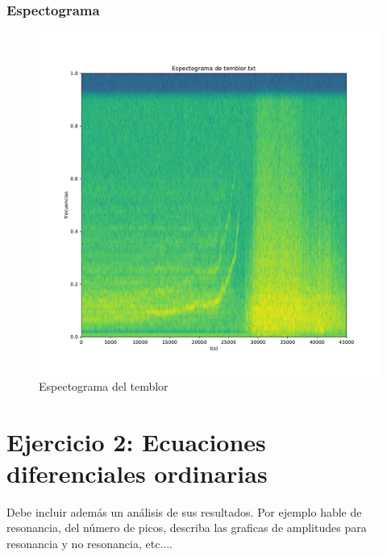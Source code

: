 \documentclass[11pt,letterpaper]{exam}
\begin{document}
\subsubsection{Espectograma}
\begin{figure}[H]
    \centering
    \includegraphics[width=1\textwidth]{espectograma_temblor.pdf}
    \caption{Espectograma del temblor}
    \label{fig:my_label}
\end{figure}
\section{Ejercicio 2: Ecuaciones diferenciales ordinarias}
 Debe incluir además un análisis de sus resultados. Por ejemplo hable de resonancia, del número de picos, describa las graficas de amplitudes para resonancia y no resonancia, etc....
\end{document}
